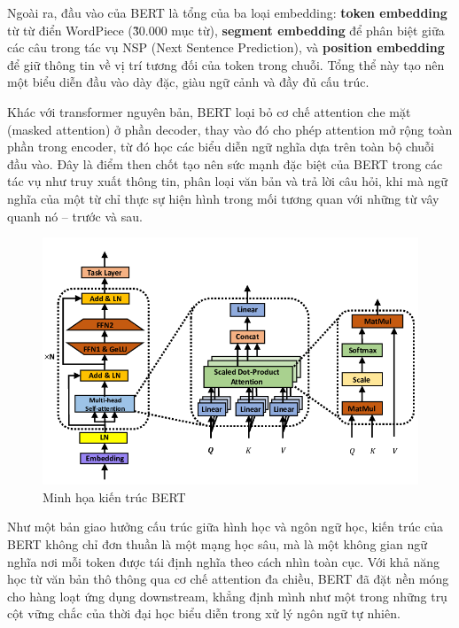 Ngoài ra, đầu vào của BERT là tổng của ba loại embedding: \textbf{token embedding} từ từ điển WordPiece (\~30.000 mục từ), \textbf{segment embedding} để phân biệt giữa các câu trong tác vụ NSP (Next Sentence Prediction), và \textbf{position embedding} để giữ thông tin về vị trí tương đối của token trong chuỗi. Tổng thể này tạo nên một biểu diễn đầu vào dày đặc, giàu ngữ cảnh và đầy đủ cấu trúc.

Khác với transformer nguyên bản, BERT loại bỏ cơ chế attention che mặt (masked attention) ở phần decoder, thay vào đó cho phép attention mở rộng toàn phần trong encoder, từ đó học các biểu diễn ngữ nghĩa dựa trên toàn bộ chuỗi đầu vào. Đây là điểm then chốt tạo nên sức mạnh đặc biệt của BERT trong các tác vụ như truy xuất thông tin, phân loại văn bản và trả lời câu hỏi, khi mà ngữ nghĩa của một từ chỉ thực sự hiện hình trong mối tương quan với những từ vây quanh nó -- trước và sau.

\begin{figure}[H]
    \centering
    \caption{Minh họa kiến trúc BERT}
    \includegraphics[width=\linewidth]{assets/bert.png}
\end{figure}

Như một bản giao hưởng cấu trúc giữa hình học và ngôn ngữ học, kiến trúc của BERT không chỉ đơn thuần là một mạng học sâu, mà là một không gian ngữ nghĩa nơi mỗi token được tái định nghĩa theo cách nhìn toàn cục. Với khả năng học từ văn bản thô thông qua cơ chế attention đa chiều, BERT đã đặt nền móng cho hàng loạt ứng dụng downstream, khẳng định mình như một trong những trụ cột vững chắc của thời đại học biểu diễn trong xử lý ngôn ngữ tự nhiên.
